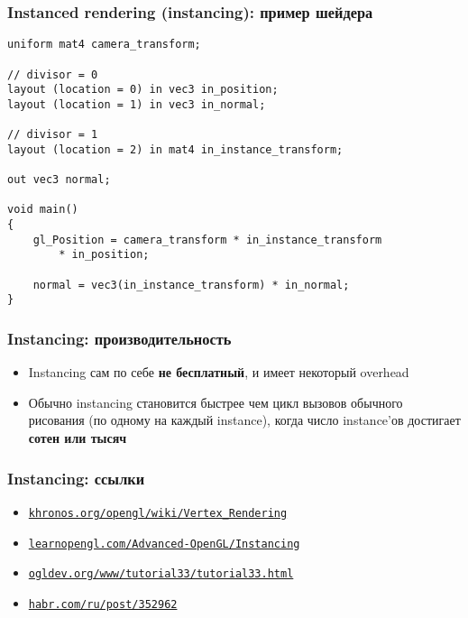 \documentclass{beamer}
\begin{document}
\begin{frame}[fragile]
\frametitle{Instanced rendering (instancing): пример шейдера}
\begin{verbatim}
uniform mat4 camera_transform;

// divisor = 0
layout (location = 0) in vec3 in_position;
layout (location = 1) in vec3 in_normal;

// divisor = 1
layout (location = 2) in mat4 in_instance_transform;

out vec3 normal;

void main()
{
    gl_Position = camera_transform * in_instance_transform
        * in_position;

    normal = vec3(in_instance_transform) * in_normal;
}
\end{verbatim}
\end{frame}

\begin{frame}[fragile]
\frametitle{Instancing: производительность}
\begin{itemize}
\item Instancing сам по себе \textbf{не бесплатный}, и имеет некоторый overhead
\pause
\item Обычно instancing становится быстрее чем цикл вызовов обычного рисования (по одному на каждый instance), когда число instance'ов достигает \textbf{сотен или тысяч}
\end{itemize}
\end{frame}

\begin{frame}[fragile]
\frametitle{Instancing: ссылки}
\begin{itemize}
\item \href{https://www.khronos.org/opengl/wiki/Vertex_Rendering#Instancing}{\texttt{khronos.org/opengl/wiki/Vertex\_Rendering}}
\item \href{https://learnopengl.com/Advanced-OpenGL/Instancing}{\texttt{learnopengl.com/Advanced-OpenGL/Instancing}}
\item \href{https://ogldev.org/www/tutorial33/tutorial33.html}{\texttt{ogldev.org/www/tutorial33/tutorial33.html}}
\item \href{https://habr.com/ru/post/352962}{\texttt{habr.com/ru/post/352962}}
\end{itemize}
\end{frame}
\end{document}

